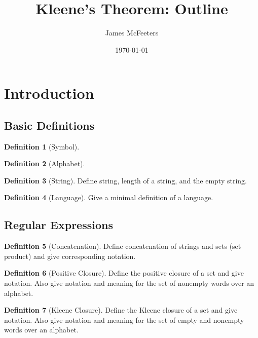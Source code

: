 \documentclass[12 pt, twoside, letterpaper]{article}
\title{Kleene's Theorem: Outline}
\author{James McFeeters}
\date{\today}
\theoremstyle{definition}
\newtheorem{definition}{Definition}
\theoremstyle{plain}
\begin{document}
\maketitle

\section{Introduction} %
\label{sec:introduction}

	\subsection{Basic Definitions} %
	\label{sub:basic_definitions}

		\begin{definition}[Symbol]
			
		\end{definition}

		\begin{definition}[Alphabet]

		\end{definition}

		\begin{definition}[String]
			Define string, length of a string, and the empty string.
		\end{definition}

		\begin{definition}[Language]
			Give a minimal definition of a language.
		\end{definition}

	\subsection{Regular Expressions} %
	\label{sub:regular_expressions}
		
		\begin{definition}[Concatenation]
			Define concatenation of strings and sets (set product) and give corresponding notation.
		\end{definition}

		\begin{definition}[Positive Closure]
			Define the positive closure of a set and give notation. 
			Also give notation and meaning for the set of nonempty words over an alphabet.
		\end{definition}

		\begin{definition}[Kleene Closure]
			Define the Kleene closure of a set and give notation.
			Also give notation and meaning for the set of empty and nonempty words over an alphabet.
		\end{definition}
\end{document}
